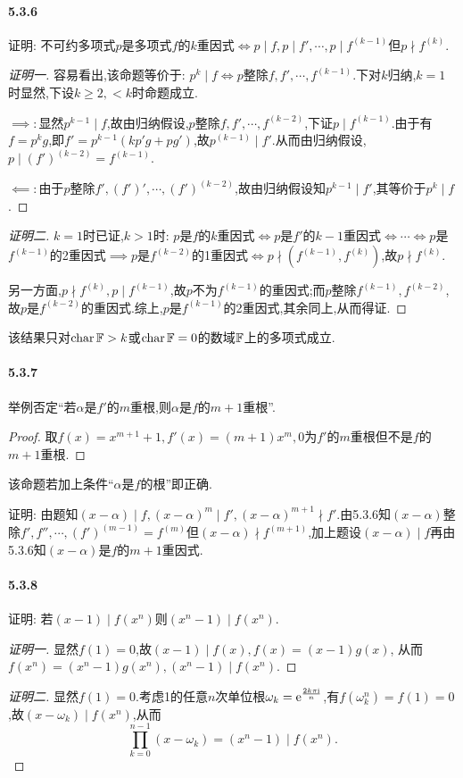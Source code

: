 \documentclass[11pt]{article}
\begin{document}
\paragraph{5.3.6}证明: 不可约多项式$p$是多项式$f$的$k$重因式$\iff p\mid f, p\mid f',\cdots,p\mid f^{(k-1)}$但$p\nmid f^{(k)}$.
\begin{proof}[证明一]
    容易看出,该命题等价于: $p^k\mid f \iff p$整除$f, f',\cdots, f^{(k-1)}$.下对$k$归纳,$k=1$时显然,下设$k\geq 2, <k$时命题成立.

    $\implies:$显然$p^{k-1}\mid f$,故由归纳假设,$p$整除$f,f',\cdots,f^{(k-2)}$,下证$p\mid f^{(k-1)}$.由于有$f=p^kg$,即$f'=p^{k-1}(kp'g+pg')$,故$p^{(k-1)}\mid f'$.从而由归纳假设,$p\mid (f')^{(k-2)}=f^{(k-1)}$.
    
    $\impliedby:$由于$p$整除$f',(f')',\cdots,(f')^{(k-2)}$,故由归纳假设知$p^{k-1}\mid f'$,其等价于$p^k\mid f$.
\end{proof}
\begin{proof}[证明二]
    $k=1$时已证,$k>1$时: $p$是$f$的$k$重因式$\iff p$是$f'$的$k-1$重因式$\iff\cdots\iff p$是$f^{(k-1)}$的2重因式$\implies p$是$f^{(k-2)}$的1重因式$\iff p\nmid (f^{(k-1)},f^{(k)})$,故$p\nmid f^{(k)}$.

    另一方面,$p\nmid f^{(k)}, p\mid f^{(k-1)}$,故$p$不为$f^{(k-1)}$的重因式;而$p$整除$f^{(k-1)},f^{(k-2)}$,故$p$是$f^{(k-2)}$的重因式.综上,$p$是$f^{(k-1)}$的2重因式,其余同上,从而得证.
\end{proof}
\begin{remark}
    该结果只对$\operatorname{char}\mathbb{F}>k$或$\operatorname{char}\mathbb{F}=0$的数域$\mathbb{F}$上的多项式成立.
\end{remark}
\paragraph{5.3.7}举例否定``若$\alpha$是$f'$的$m$重根,则$\alpha$是$f$的$m+1$重根''.
\begin{proof}
    取$f(x)=x^{m+1}+1, f'(x)=(m+1)x^m, 0$为$f'$的$m$重根但不是$f$的$m+1$重根.
\end{proof}
\begin{remark}
    该命题若加上条件``$\alpha$是$f$的根''即正确.

    证明: 由题知$(x-\alpha)\mid f, (x-\alpha)^m\mid f', (x-\alpha)^{m+1}\nmid f'$.由5.3.6知$(x-\alpha)$整除$f', f'', \cdots, (f')^{(m-1)}=f^{(m)}$但$(x-\alpha)\nmid f^{(m+1)}$,加上题设$(x-\alpha)\mid f$再由5.3.6知$(x-\alpha)$是$f$的$m+1$重因式.
\end{remark}
\paragraph{5.3.8}证明: 若$(x-1)\mid f(x^n)$则$(x^n-1)\mid f(x^n)$.
\begin{proof}[证明一]
    显然$f(1)=0$,故$(x-1)\mid f(x), f(x)=(x-1)g(x)$, 从而$f(x^n)=(x^n-1)g(x^n), (x^n-1)\mid f(x^n)$.
\end{proof}
\begin{proof}[证明二]
    显然$f(1)=0$.考虑1的任意$n$次单位根$\omega_k=\mathrm{e}^{\frac{2k\pi\mathrm{i}}{n}}$,有$f(\omega_k^n)=f(1)=0$,故$(x-\omega_k)\mid f(x^n)$,从而
    $$\prod_{k=0}^{n-1}(x-\omega_k)=(x^n-1)\mid f(x^n).$$
\end{proof}
\end{document}
